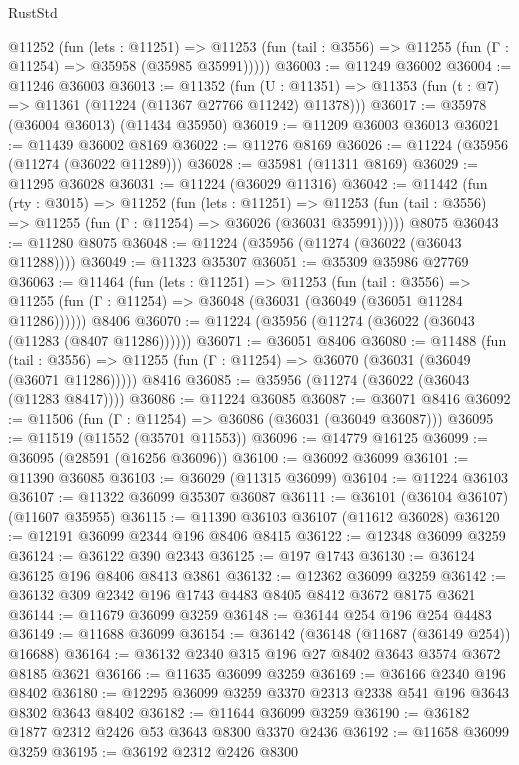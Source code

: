\begin{lexlean}{RustStd}
\begin{coremodule}
    @11252
      (fun (lets : @11251) =>
      @11253 (fun (tail : @3556) => @11255 (fun (Γ : @11254) => @35958 (@35985 @35991)))))
@36003 := @11249 @36002
@36004 := @11246 @36003
@36013 := @11352
    (fun (U : @11351) => @11353 (fun (t : @7) => @11361 (@11224 (@11367 @27766 @11242) @11378)))
@36017 := @35978 (@36004 @36013) (@11434 @35950)
@36019 := @11209 @36003 @36013
@36021 := @11439 @36002 @8169
@36022 := @11276 @8169
@36026 := @11224 (@35956 (@11274 (@36022 @11289)))
@36028 := @35981 (@11311 @8169)
@36029 := @11295 @36028
@36031 := @11224 (@36029 @11316)
@36042 := @11442
    (fun (rty : @3015) =>
    @11252
      (fun (lets : @11251) =>
      @11253 (fun (tail : @3556) => @11255 (fun (Γ : @11254) => @36026 (@36031 @35991)))))
    @8075
@36043 := @11280 @8075
@36048 := @11224 (@35956 (@11274 (@36022 (@36043 @11288))))
@36049 := @11323 @35307
@36051 := @35309 @35986 @27769
@36063 := @11464
    (fun (lets : @11251) =>
    @11253
      (fun (tail : @3556) =>
      @11255 (fun (Γ : @11254) => @36048 (@36031 (@36049 (@36051 @11284 @11286))))))
    @8406
@36070 := @11224 (@35956 (@11274 (@36022 (@36043 (@11283 (@8407 @11286))))))
@36071 := @36051 @8406
@36080 := @11488
    (fun (tail : @3556) => @11255 (fun (Γ : @11254) => @36070 (@36031 (@36049 (@36071 @11286)))))
    @8416
@36085 := @35956 (@11274 (@36022 (@36043 (@11283 @8417))))
@36086 := @11224 @36085
@36087 := @36071 @8416
@36092 := @11506 (fun (Γ : @11254) => @36086 (@36031 (@36049 @36087)))
@36095 := @11519 (@11552 (@35701 @11553))
@36096 := @14779 @16125
@36099 := @36095 (@28591 (@16256 @36096))
@36100 := @36092 @36099
@36101 := @11390 @36085
@36103 := @36029 (@11315 @36099)
@36104 := @11224 @36103
@36107 := @11322 @36099 @35307 @36087
@36111 := @36101 (@36104 @36107) (@11607 @35955)
@36115 := @11390 @36103 @36107 (@11612 @36028)
@36120 := @12191 @36099 @2344 @196 @8406 @8415
@36122 := @12348 @36099 @3259
@36124 := @36122 @390 @2343
@36125 := @197 @1743
@36130 := @36124 @36125 @196 @8406 @8413 @3861
@36132 := @12362 @36099 @3259
@36142 := @36132 @309 @2342 @196 @1743 @4483 @8405 @8412 @3672 @8175 @3621
@36144 := @11679 @36099 @3259
@36148 := @36144 @254 @196 @254 @4483
@36149 := @11688 @36099
@36154 := @36142 (@36148 (@11687 (@36149 @254)) @16688)
@36164 := @36132 @2340 @315 @196 @27 @8402 @3643 @3574 @3672 @8185 @3621
@36166 := @11635 @36099 @3259
@36169 := @36166 @2340 @196 @8402
@36180 := @12295 @36099 @3259 @3370 @2313 @2338 @541 @196 @3643 @8302 @3643 @8402
@36182 := @11644 @36099 @3259
@36190 := @36182 @1877 @2312 @2426 @53 @3643 @8300 @3370 @2436
@36192 := @11658 @36099 @3259
@36195 := @36192 @2312 @2426 @8300

\end{coremodule}
\end{lexlean}
